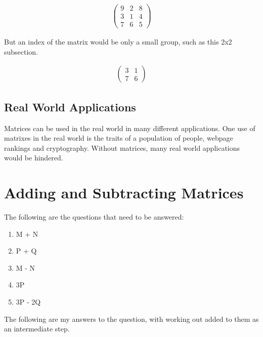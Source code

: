 \documentclass[a4paper,10pt]{article}
\begin{document}
    \begin{align*}
      \begin{pmatrix}
        9 & 2 & 8\\
        3 & 1 & 4\\
        7 & 6 & 5
      \end{pmatrix}
    \end{align*}

    But an index of the matrix would be only a small group, such as this 2x2 subsection.

    \begin{align*}
      \begin{pmatrix}
        3 & 1\\
        7 & 6
      \end{pmatrix}
    \end{align*}

    \subsection{Real World Applications}
      Matrices can be used in the real world in many different applications. One use of matrixes in the real world is the traits of a population of people, webpage rankings and cryptography. Without matrices, many real world applications would be hindered.

  \newpage

  \section{Adding and Subtracting Matrices}
    The following are the questions that need to be answered:
    \begin{enumerate}
      \item M + N
      \item P + Q
      \item M - N
      \item 3P
      \item 3P - 2Q
    \end{enumerate}
    The following are my answers to the question, with working out added to them as an intermediate step.
\end{document}
